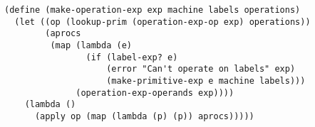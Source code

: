 \documentclass[a4paper,12pt]{article}
\begin{document}
\begin{lstlisting}
(define (make-operation-exp exp machine labels operations)
  (let ((op (lookup-prim (operation-exp-op exp) operations))
        (aprocs
         (map (lambda (e)
                (if (label-exp? e)
                    (error "Can't operate on labels" exp)
                    (make-primitive-exp e machine labels)))
              (operation-exp-operands exp))))
    (lambda ()
      (apply op (map (lambda (p) (p)) aprocs)))))
\end{lstlisting}
\end{document}
